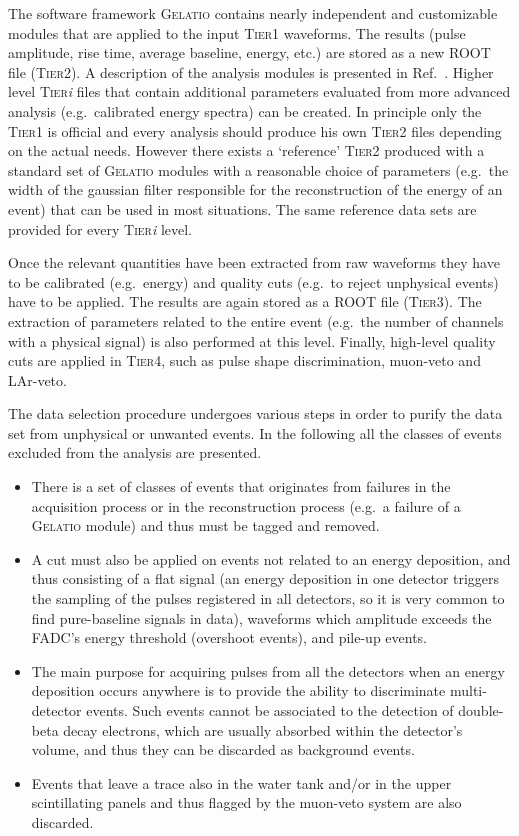 The software framework \textsc{Gelatio} \cite{GELATIO} contains nearly independent and customizable modules that are applied to the input \textsc{Tier1} waveforms. The results (pulse amplitude, rise time, average baseline, energy, etc.) are stored as a new ROOT file (\textsc{Tier2}). A description of the analysis modules is presented in Ref.~\cite{dataproc}. Higher level \textsc{Tier}\emph{i} files that contain additional parameters evaluated from more advanced analysis (e.g.~calibrated energy spectra) can be created. In principle only the \textsc{Tier1} is official and every analysis should produce his own \textsc{Tier2} files depending on the actual needs. However there exists a `reference' \textsc{Tier2} produced with a standard set of \textsc{Gelatio} modules with a reasonable choice of parameters (e.g.~the width of the gaussian filter responsible for the reconstruction of the energy of an event) that can be used in most situations. The same reference data sets are provided for every \textsc{Tier}\emph{i} level.

Once the relevant quantities have been extracted from raw waveforms they have to be calibrated (e.g.~energy) and quality cuts (e.g.~to reject unphysical events) have to be applied. The results are again stored as a ROOT file (\textsc{Tier3}). The extraction of parameters related to the entire event (e.g.~the number of channels with a physical signal) is also performed at this level. Finally, high-level quality cuts are applied in \textsc{Tier4}, such as pulse shape discrimination, muon-veto and LAr-veto.

 The data selection procedure undergoes various steps in order to purify the data set from unphysical or unwanted events. In the following all the classes of events excluded from the analysis are presented.
\begin{itemize}
	\item There is a set of classes of events that originates from failures in the acquisition process or in the reconstruction process (e.g.~a failure of a \textsc{Gelatio} module) and thus must be tagged and removed.
	\item A cut must also be applied on events not related to an energy deposition, and thus consisting of a flat signal (an energy deposition in one detector triggers the sampling of the pulses registered in all detectors, so it is very common to find pure-baseline signals in data), waveforms which amplitude exceeds the FADC's energy threshold (overshoot events), and pile-up events.
	\item The main purpose for acquiring pulses from all the detectors when an energy deposition occurs anywhere is to provide the ability to discriminate multi-detector events. Such events cannot be associated to the detection of double-beta decay electrons, which are usually absorbed within the detector's volume, and thus they can be discarded as background events.
	\item Events that leave a trace also in the water tank and/or in the upper scintillating panels and thus flagged by the muon-veto system are also discarded.
\end{itemize}

